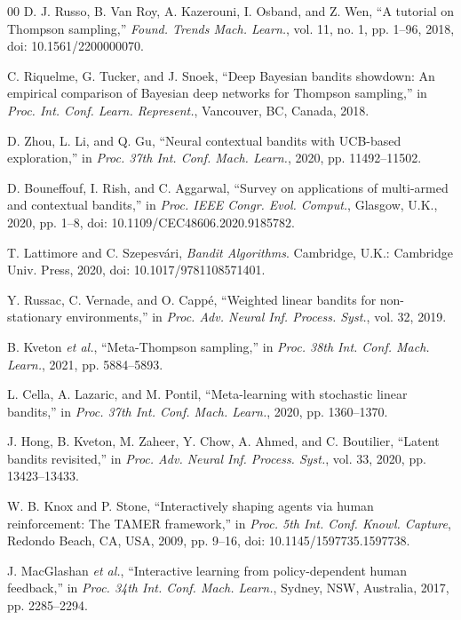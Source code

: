 \documentclass{ieeeaccess}
\begin{document}
\begin{thebibliography}{00}
 D. J. Russo, B. Van Roy, A. Kazerouni, I. Osband, and Z. Wen, ``A tutorial on Thompson sampling,'' \emph{Found. Trends Mach. Learn.}, vol. 11, no. 1, pp. 1--96, 2018, doi: 10.1561/2200000070.

 C. Riquelme, G. Tucker, and J. Snoek, ``Deep Bayesian bandits showdown: An empirical comparison of Bayesian deep networks for Thompson sampling,'' in \emph{Proc. Int. Conf. Learn. Represent.}, Vancouver, BC, Canada, 2018.

 D. Zhou, L. Li, and Q. Gu, ``Neural contextual bandits with UCB-based exploration,'' in \emph{Proc. 37th Int. Conf. Mach. Learn.}, 2020, pp. 11492--11502.

 D. Bouneffouf, I. Rish, and C. Aggarwal, ``Survey on applications of multi-armed and contextual bandits,'' in \emph{Proc. IEEE Congr. Evol. Comput.}, Glasgow, U.K., 2020, pp. 1--8, doi: 10.1109/CEC48606.2020.9185782.

 T. Lattimore and C. Szepesv\'{a}ri, \emph{Bandit Algorithms}. Cambridge, U.K.: Cambridge Univ. Press, 2020, doi: 10.1017/9781108571401.

 Y. Russac, C. Vernade, and O. Capp\'{e}, ``Weighted linear bandits for non-stationary environments,'' in \emph{Proc. Adv. Neural Inf. Process. Syst.}, vol. 32, 2019.

 B. Kveton \emph{et al.}, ``Meta-Thompson sampling,'' in \emph{Proc. 38th Int. Conf. Mach. Learn.}, 2021, pp. 5884--5893.

 L. Cella, A. Lazaric, and M. Pontil, ``Meta-learning with stochastic linear bandits,'' in \emph{Proc. 37th Int. Conf. Mach. Learn.}, 2020, pp. 1360--1370.

 J. Hong, B. Kveton, M. Zaheer, Y. Chow, A. Ahmed, and C. Boutilier, ``Latent bandits revisited,'' in \emph{Proc. Adv. Neural Inf. Process. Syst.}, vol. 33, 2020, pp. 13423--13433.

 W. B. Knox and P. Stone, ``Interactively shaping agents via human reinforcement: The TAMER framework,'' in \emph{Proc. 5th Int. Conf. Knowl. Capture}, Redondo Beach, CA, USA, 2009, pp. 9--16, doi: 10.1145/1597735.1597738.

 J. MacGlashan \emph{et al.}, ``Interactive learning from policy-dependent human feedback,'' in \emph{Proc. 34th Int. Conf. Mach. Learn.}, Sydney, NSW, Australia, 2017, pp. 2285--2294.


\end{thebibliography}
\end{document}
